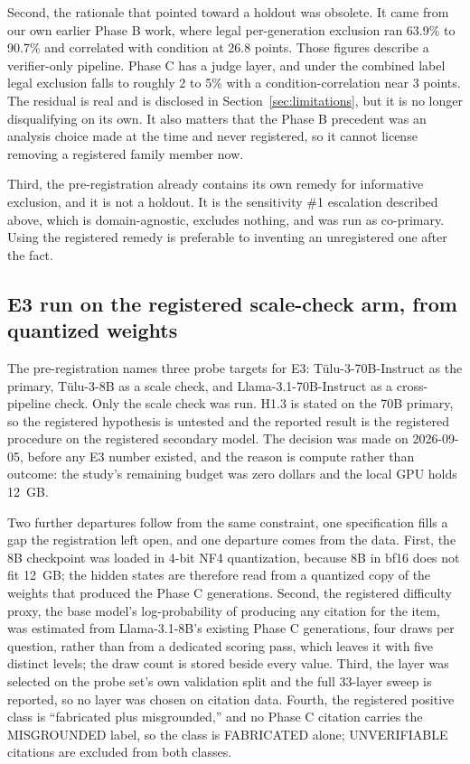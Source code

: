 Second, the rationale that pointed toward a holdout was obsolete. It came from
our own earlier Phase B work, where legal per-generation exclusion ran 63.9\% to
90.7\% and correlated with condition at 26.8 points. Those figures describe a
verifier-only pipeline. Phase C has a judge layer, and under the combined label
legal exclusion falls to roughly 2 to 5\% with a condition-correlation near 3
points. The residual is real and is disclosed in
Section~\ref{sec:limitations}, but it is no longer disqualifying on its own. It
also matters that the Phase B precedent was an analysis choice made at the time
and never registered, so it cannot license removing a registered family member
now.

Third, the pre-registration already contains its own remedy for informative
exclusion, and it is not a holdout. It is the sensitivity \#1 escalation
described above, which is domain-agnostic, excludes nothing, and was run as
co-primary. Using the registered remedy is preferable to inventing an
unregistered one after the fact.


\subsection{E3 run on the registered scale-check arm, from quantized weights}

The pre-registration names three probe targets for E3: Tülu-3-70B-Instruct as
the primary, Tülu-3-8B as a scale check, and Llama-3.1-70B-Instruct as a
cross-pipeline check. Only the scale check was run. H1.3 is stated on the 70B
primary, so the registered hypothesis is untested and the reported result is
the registered procedure on the registered secondary model. The decision was
made on 2026-09-05, before any E3 number existed, and the reason is compute
rather than outcome: the study's remaining budget was zero dollars and the local
GPU holds 12~GB.

Two further departures follow from the same constraint, one specification
fills a gap the registration left open, and one departure comes from the data.
First, the 8B checkpoint was loaded in 4-bit NF4 quantization, because 8B
in bf16 does not fit 12~GB; the hidden states are therefore read from a
quantized copy of the weights that produced the Phase C generations. Second, the
registered difficulty proxy, the base model's log-probability of producing any
citation for the item, was estimated from Llama-3.1-8B's existing Phase C
generations, four draws per question, rather than from a dedicated scoring
pass, which leaves it with five distinct levels; the draw count is stored beside
every value. Third, the layer was selected on the probe set's own validation
split and the full 33-layer sweep is reported, so no layer was chosen on
citation data. Fourth, the registered positive class is ``fabricated plus
misgrounded,'' and no Phase C citation carries the MISGROUNDED label, so the
class is FABRICATED alone; UNVERIFIABLE citations are excluded from both
classes.

